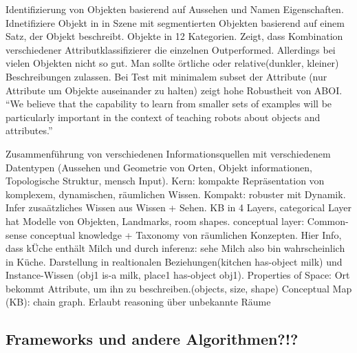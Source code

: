 \par

\cite{atrBasedObjIden} \newline
Identifizierung von Objekten basierend auf Aussehen und Namen Eigenschaften. \newline
Idnetifiziere Objekt in in Szene mit segmentierten Objekten basierend auf einem Satz, der Objekt beschreibt.  Objekte in 12 Kategorien. \newline
Zeigt, dass Kombination verschiedener Attributklassifizierer die einzelnen Outperformed. Allerdings bei vielen Objekten nicht so gut. Man sollte örtliche oder relative(dunkler, kleiner) Beschreibungen zulassen. Bei Test mit minimalem subset der Attribute (nur Attribute um Objekte auseinander zu halten) zeigt hohe Robustheit von ABOI.
``We believe that the capability to learn from smaller sets
of examples will be particularly important in the context of
teaching robots about objects and attributes.'' \par


\cite{pronobis1} \newline
Zusammenführung von verschiedenen Informationsquellen mit verschiedenem Datentypen (Aussehen und Geometrie von Orten, Objekt informationen, Topologische Struktur, mensch Input). Kern: kompakte Repräsentation von komplexem, dynamischen, räumlichen Wissen. \newline
Kompakt: robuster mit Dynamik. \newline
Infer zusaätzliches Wissen aus Wissen + Sehen. \newline
KB in 4 Layers, categorical Layer hat Modelle von Objekten, Landmarks, room shapes. \newline
conceptual layer: Common-sense conceptual knowledge + Taxonomy von räumlichen Konzepten. Hier Info, dass kÜche enthält Milch und durch inferenz: sehe Milch also bin wahrscheinlich in Küche. Darstellung in realtionalen Beziehungen(kitchen has-object milk) und Instance-Wissen (obj1 is-a milk, place1 has-object obj1).\newline
Properties of Space: Ort bekommt Attribute, um ihn zu beschreiben.(objects, size, shape) \newline
Conceptual Map (KB): chain graph. Erlaubt reasoning über unbekannte Räume





\subsection{Frameworks und andere Algorithmen?!?}

